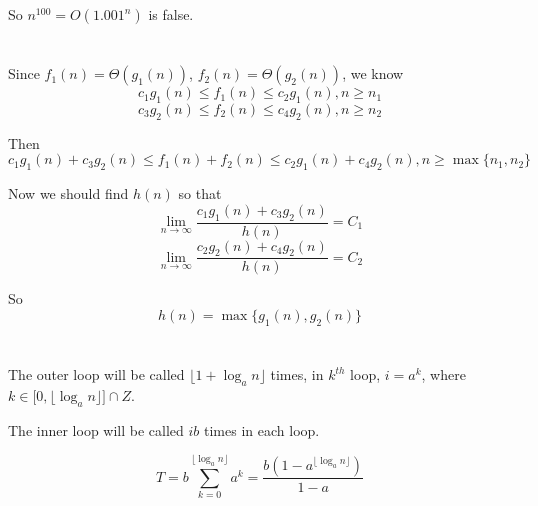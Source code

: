 \documentclass{article}
\begin{document}
So $n^{100}=O(1.001^n)$ is false.

\section{}
Since $f_1(n)=\Theta(g_1(n))$, $f_2(n)=\Theta(g_2(n))$, we know
$$c_1g_1(n)\leqslant f_1(n)\leqslant c_2g_1(n),n\geqslant n_1$$
$$c_3g_2(n)\leqslant f_2(n)\leqslant c_4g_2(n),n\geqslant n_2$$

Then
$$c_1g_1(n)+c_3g_2(n)\leqslant f_1(n)+f_2(n)\leqslant c_2g_1(n)+c_4g_2(n),n\geqslant \max\{n_1,n_2\}$$

Now we should find $h(n)$ so that
$$\lim_{n\to\infty}\frac{c_1g_1(n)+c_3g_2(n)}{h(n)}=C_1$$
$$\lim_{n\to\infty}\frac{c_2g_2(n)+c_4g_2(n)}{h(n)}=C_2$$

So $$h(n)=\max\{g_1(n),g_2(n)\}$$

\section{}
The outer loop will be called $\lfloor1+\log_an\rfloor$ times, in $k^{th}$ loop, $i=a^k$, where $k\in\Big[0,\lfloor\log_an\rfloor\Big]\cap Z$.

The inner loop will be called $ib$ times in each loop.

$$T=b\sum_{k=0}^{\lfloor\log_an\rfloor}a^k=\frac{b\left(1-a^{\lfloor\log_an\rfloor}\right)}{1-a}$$

\section{}
\end{document}
